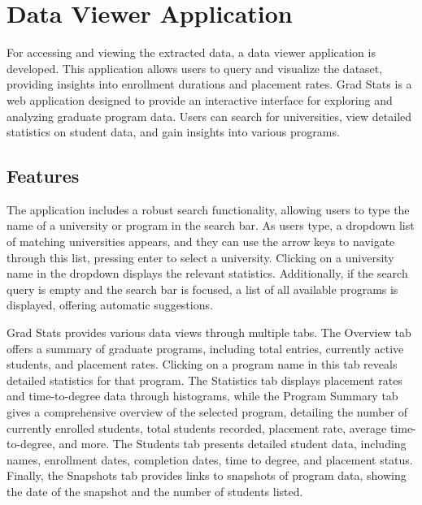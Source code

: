 \documentclass[11pt]{article}
\begin{document}

\section{Data Viewer Application}

    For accessing and viewing the extracted data, a data viewer application is developed. This application allows users to query and visualize the dataset, providing insights into enrollment durations and placement rates.
Grad Stats is a web application designed to provide an interactive interface for exploring and analyzing graduate program data. Users can search for universities, view detailed statistics on student data, and gain insights into various programs.

\subsection{Features}

The application includes a robust search functionality, allowing users to type the name of a university or program in the search bar. As users type, a dropdown list of matching universities appears, and they can use the arrow keys to navigate through this list, pressing enter to select a university. Clicking on a university name in the dropdown displays the relevant statistics. Additionally, if the search query is empty and the search bar is focused, a list of all available programs is displayed, offering automatic suggestions.

Grad Stats provides various data views through multiple tabs. The Overview tab offers a summary of graduate programs, including total entries, currently active students, and placement rates. Clicking on a program name in this tab reveals detailed statistics for that program. The Statistics tab displays placement rates and time-to-degree data through histograms, while the Program Summary tab gives a comprehensive overview of the selected program, detailing the number of currently enrolled students, total students recorded, placement rate, average time-to-degree, and more. The Students tab presents detailed student data, including names, enrollment dates, completion dates, time to degree, and placement status. Finally, the Snapshots tab provides links to snapshots of program data, showing the date of the snapshot and the number of students listed.
\end{document}
